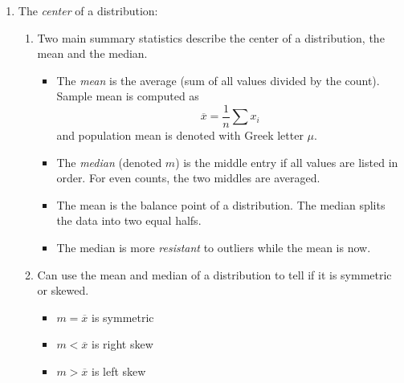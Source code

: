 \documentclass{article}
\begin{document}
\begin{enumerate}
\item The \emph{center} of a distribution:
\begin{enumerate}
\item Two main summary statistics describe the center of a distribution, the mean and the median.
\begin{itemize}
\item The \emph{mean} is the average (sum of all values divided by the count). Sample mean is computed as
\[
\overline{x} = \frac{1}{n} \sum x_i
\]
and population mean is denoted with Greek letter $\mu$.
\item The \emph{median} (denoted $m$) is the middle entry if all values are listed in order. For even counts, the two middles are averaged.
\item The mean is the balance point of a distribution. The median splits the data into two equal halfs.
\item The median is more \emph{resistant} to outliers while the mean is now.
\end{itemize}
\item Can use the mean and median of a distribution to tell if it is symmetric or skewed.
\begin{itemize}
\item $m=\overline{x}$ is symmetric
\item $m<\overline{x}$ is right skew
\item $m>\overline{x}$ is left skew
\end{itemize}
\end{enumerate}


\end{enumerate}
\end{document}
